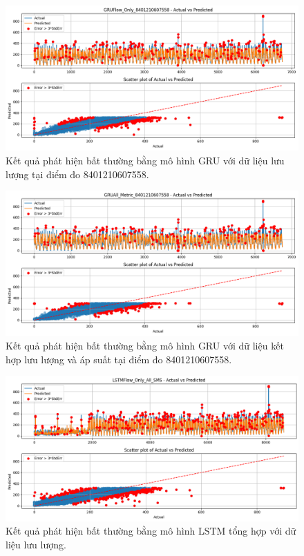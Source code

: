\begin{figure}[htbp]
    \centering
    \includegraphics[width=\textwidth]{image/section6_3/anomaly_detection_8401210607558_gru_flow.png}
    \caption{Kết quả phát hiện bất thường bằng mô hình GRU với dữ liệu lưu lượng tại điểm đo 8401210607558.}
    \label{fig:anomaly_gru_8401210607558_flow}
\end{figure}

\begin{figure}[htbp]
    \centering
    \includegraphics[width=\textwidth]{image/section6_3/anomaly_detection_8401210607558_gru_allmetric.png}
    \caption{Kết quả phát hiện bất thường bằng mô hình GRU với dữ liệu kết hợp lưu lượng và áp suất tại điểm đo 8401210607558.}
    \label{fig:anomaly_gru_8401210607558_all}
\end{figure}

\begin{figure}[htbp]
    \centering
    \includegraphics[width=\textwidth]{image/section6_3/anomaly_detection_combined_lstm_flow.png}
    \caption{Kết quả phát hiện bất thường bằng mô hình LSTM tổng hợp với dữ liệu lưu lượng.}
    \label{fig:anomaly_combined_lstm_flow}
\end{figure}

